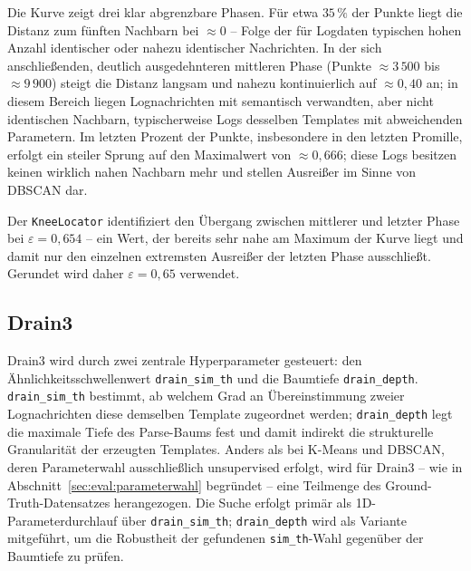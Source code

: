 Die Kurve zeigt drei klar abgrenzbare Phasen. Für etwa $35\,\%$ der Punkte
liegt die Distanz zum fünften Nachbarn bei $\approx 0$ -- Folge der für
Logdaten typischen hohen Anzahl identischer oder nahezu identischer
Nachrichten. In der sich anschließenden, deutlich
ausgedehnteren mittleren Phase (Punkte $\approx 3\,500$ bis $\approx 9\,900$)
steigt die Distanz langsam und nahezu kontinuierlich auf $\approx 0{,}40$ an;
in diesem Bereich liegen Lognachrichten mit semantisch verwandten, aber nicht
identischen Nachbarn, typischerweise Logs desselben Templates mit
abweichenden Parametern. Im letzten Prozent der Punkte, insbesondere in den
letzten Promille, erfolgt ein steiler Sprung auf den Maximalwert von
$\approx 0{,}666$; diese Logs besitzen keinen wirklich nahen Nachbarn mehr und
stellen Ausreißer im Sinne von DBSCAN dar.

Der \texttt{KneeLocator} identifiziert den Übergang zwischen mittlerer und
letzter Phase bei $\varepsilon = 0{,}654$ -- ein Wert, der bereits sehr nahe
am Maximum der Kurve liegt und damit nur den einzelnen extremsten Ausreißer
der letzten Phase ausschließt. Gerundet wird daher $\varepsilon = 0{,}65$
verwendet.

\subsection{Drain3}
\label{sec:eval:param:drain3}

Drain3 wird durch zwei zentrale Hyperparameter gesteuert: den
Ähnlichkeitsschwellenwert \texttt{drain\_sim\_th} und die Baumtiefe
\texttt{drain\_depth}. \texttt{drain\_sim\_th} bestimmt, ab welchem Grad an
Übereinstimmung zweier Lognachrichten diese demselben Template zugeordnet
werden; \texttt{drain\_depth} legt die maximale Tiefe des Parse-Baums fest und
damit indirekt die strukturelle Granularität der erzeugten Templates. Anders
als bei K-Means und DBSCAN, deren Parameterwahl ausschließlich unsupervised
erfolgt, wird für Drain3 -- wie in Abschnitt~\ref{sec:eval:parameterwahl}
begründet -- eine Teilmenge des Ground-Truth-Datensatzes herangezogen. Die
Suche erfolgt primär als 1D-Parameterdurchlauf über \texttt{drain\_sim\_th};
\texttt{drain\_depth} wird als Variante mitgeführt, um die Robustheit der
gefundenen \texttt{sim\_th}-Wahl gegenüber der Baumtiefe zu prüfen.

